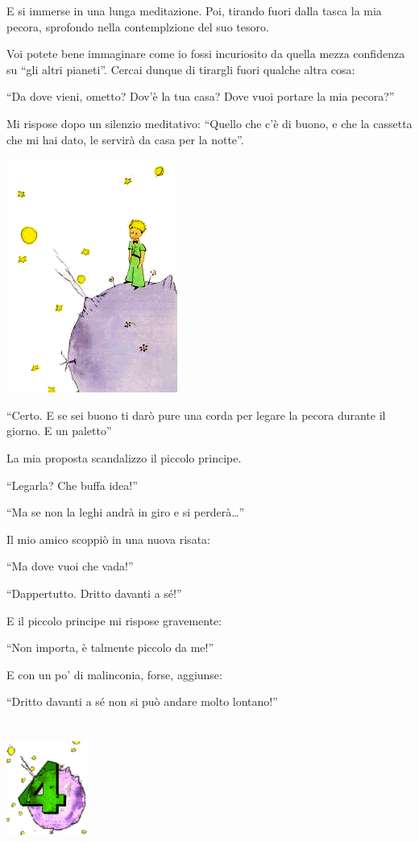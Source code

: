 \documentclass[11pt]{scrbook}
\begin{document}
E si immerse in una lunga meditazione. Poi, tirando fuori dalla tasca la mia pecora, sprofondo nella contemplzione del suo tesoro.

Voi potete bene immaginare come io fossi incuriosito da quella mezza confidenza su ``gli altri pianeti''. Cercai dunque di tirargli fuori qualche altra cosa:

``Da dove vieni, ometto? Dov'è la tua casa? Dove vuoi portare la mia pecora?''

Mi rispose dopo un silenzio meditativo: ``Quello che c'è di buono, e che la cassetta che mi hai dato, le servirà da casa per la notte''.

\begin{center}
\includegraphics{img/estrellas}
\end{center}

``Certo. E se sei buono ti darò pure una corda per legare la pecora durante il giorno. E un paletto''

La mia proposta scandalizzo il piccolo principe.

``Legarla? Che buffa idea!''

``Ma se non la leghi andrà in giro e si perderà\ldots{}''

Il mio amico scoppiò in una nuova risata:

``Ma dove vuoi che vada!''

``Dappertutto. Dritto davanti a sé!''

E il piccolo principe mi rispose gravemente:

``Non importa, è talmente piccolo da me!''

E con un po' di malinconia, forse, aggiunse:

``Dritto davanti a sé non si può andare molto lontano!''

\chapter{}
\begin{center}
\includegraphics{img/chapter4}
\end{center}
\end{document}
